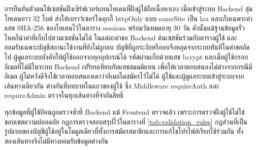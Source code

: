 การยืนยันตัวตนใช้เซสชันฝั่งเซิร์ฟเวอร์แทนโทเคนที่ฝั่งผู้ใช้ถือเนื้อหาเอง เมื่อเข้าสู่ระบบ Backend สุ่มโทเคนยาว 32 ไบต์ ส่งให้เบราว์เซอร์ในคุกกี้ httpOnly แบบ sameSite เป็น lax และเก็บเฉพาะค่าแฮช SHA-256 ของโทเคนไว้ในตาราง sessions พร้อมวันหมดอายุ 30 วัน ดังนั้นแม้ฐานข้อมูลรั่วไหลก็นำค่าที่เก็บไปสวมเซสชันไม่ได้ ในแต่ละคำขอ Backend ค้นเซสชันร่วมกับตารางผู้ใช้ และยอมรับเฉพาะบัญชีสถานะใช้งานที่ยังไม่ถูกลบ บัญชีที่ถูกระงับหรือลบจึงหลุดจากระบบทันทีในคำขอถัดไป ผู้ดูแลระบบบังคับให้ผู้ใช้ออกจากทุกอุปกรณ์ได้ รหัสผ่านเก็บด้วยแฮช bcrypt และเมื่อผู้ใช้กรอกอีเมลที่ไม่มีในระบบ Backend เปรียบเทียบกับแฮชสมมติแทน เพื่อให้เวลาตอบสนองไม่ต่างจากกรณีมีอีเมล ผู้ไม่หวังดีจึงใช้เวลาตอบสนองเดาว่าอีเมลใดสมัครไว้ไม่ได้ ผู้ใช้และผู้ดูแลระบบเข้าสู่ระบบจากเส้นทางเดียวกัน ต่างกันที่บทบาทในแถวของผู้ใช้ ซึ่ง Middleware requireAuth และ requireAdmin ตรวจในทุกเส้นทางที่จำกัดสิทธิ์

ทุกข้อมูลที่ผู้ใช้ป้อนถูกตรวจซ้ำที่ Backend แม้ Frontend ตรวจแล้ว เพราะการตรวจฝั่งผู้ใช้ไม่ใช่ขอบเขตความปลอดภัย กฎการตรวจสอบสรุปไว้ในตารางที่ \ref{tab:validation_rules} กฎส่วนที่เป็นรูปแบบของบัญชีผู้ใช้อยู่ในโมดูลเดียวที่ทั้งการสมัครสมาชิกและการแก้ไขโปรไฟล์เรียกใช้ร่วมกัน ทั้งสองเส้นทางจึงไม่มีทางยอมรับข้อมูลต่างกัน

